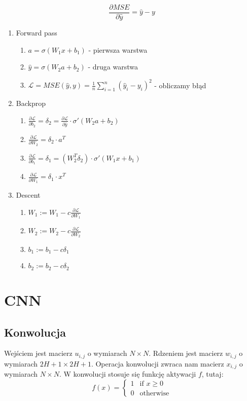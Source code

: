 \documentclass{../notatki}
\begin{document}
$$
\frac{\partial MSE}{\partial \hat{y}} = \hat{y} - y
$$

\begin{enumerate}
  \item Forward pass
    \begin{enumerate}
      \item $a = \sigma(W_1x + b_1)$ - pierwsza warstwa
      \item $\hat{y} = \sigma(W_2a + b_2)$ - druga warstwa
      \item $\mathcal{L} = MSE(\hat{y}, y) = \frac{1}{n} \sum_{i=1}^{n}
        (\hat{y}_i - y_i)^2$ - obliczamy błąd
    \end{enumerate}
  \item Backprop
    \begin{enumerate}
      \item $\frac{\partial \mathcal{L}}{\partial b_2} = \delta_2 =
        \frac{\partial \mathcal{L}}{\partial \hat{y}} \cdot
        \sigma'(W_2a + b_2)$
      \item $\frac{\partial \mathcal{L}}{\partial W_2} = \delta_2 \cdot a^T$
      \item $\frac{\partial \mathcal{L}}{\partial b_1} = \delta_1 =
        (W_2^T \delta_2) \cdot \sigma'(W_1x + b_1)$
      \item $\frac{\partial \mathcal{L}}{\partial W_1} = \delta_1 \cdot x^T$
    \end{enumerate}
  \item Descent
    \begin{enumerate}
      \item $W_1 := W_1 - c \frac{\partial \mathcal{L}}{\partial W_1}$
      \item $W_2 := W_2 - c \frac{\partial \mathcal{L}}{\partial W_2}$
      \item $b_1 := b_1 - c \delta_1$
      \item $b_2 := b_2 - c \delta_2$
    \end{enumerate}
\end{enumerate}

\section{CNN}

\subsection{Konwolucja}

Wejściem jest macierz $u_{i,j}$ o wymiarach $N \times N$. Rdzeniem jest macierz
$w_{i,j}$ o wymiarach $2H + 1 \times 2H + 1$. Operacja konwolucji zwraca nam
macierz $x_{i, j}$ o wymiarach $N \times N$. W konwolucji stosuje się funkcję
aktywacji $f$, tutaj:
$$
f(x) =
\begin{cases}
  1 & \text{if } x \geq 0 \\
  0 & \text{otherwise}
\end{cases}
$$
\end{document}
